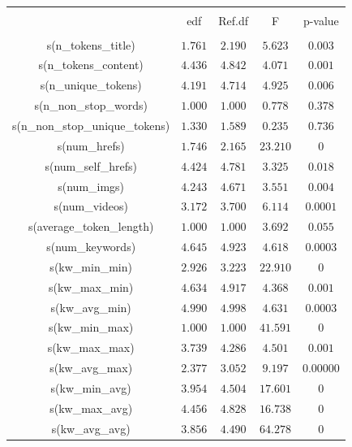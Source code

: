 
\begin{table}[h] \centering 
  \caption{} 
  \label{} 
\begin{tabular}{@{\extracolsep{5pt}} ccccc} 
\\[-1.8ex]\hline 
\hline \\[-1.8ex] 
 & edf & Ref.df & F & p-value \\ 
\hline \\[-1.8ex] 
s(n\_tokens\_title) & $1.761$ & $2.190$ & $5.623$ & $0.003$ \\ 
s(n\_tokens\_content) & $4.436$ & $4.842$ & $4.071$ & $0.001$ \\ 
s(n\_unique\_tokens) & $4.191$ & $4.714$ & $4.925$ & $0.006$ \\ 
s(n\_non\_stop\_words) & $1.000$ & $1.000$ & $0.778$ & $0.378$ \\ 
s(n\_non\_stop\_unique\_tokens) & $1.330$ & $1.589$ & $0.235$ & $0.736$ \\ 
s(num\_hrefs) & $1.746$ & $2.165$ & $23.210$ & $0$ \\ 
s(num\_self\_hrefs) & $4.424$ & $4.781$ & $3.325$ & $0.018$ \\ 
s(num\_imgs) & $4.243$ & $4.671$ & $3.551$ & $0.004$ \\ 
s(num\_videos) & $3.172$ & $3.700$ & $6.114$ & $0.0001$ \\ 
s(average\_token\_length) & $1.000$ & $1.000$ & $3.692$ & $0.055$ \\ 
s(num\_keywords) & $4.645$ & $4.923$ & $4.618$ & $0.0003$ \\ 
s(kw\_min\_min) & $2.926$ & $3.223$ & $22.910$ & $0$ \\ 
s(kw\_max\_min) & $4.634$ & $4.917$ & $4.368$ & $0.001$ \\ 
s(kw\_avg\_min) & $4.990$ & $4.998$ & $4.631$ & $0.0003$ \\ 
s(kw\_min\_max) & $1.000$ & $1.000$ & $41.591$ & $0$ \\ 
s(kw\_max\_max) & $3.739$ & $4.286$ & $4.501$ & $0.001$ \\ 
s(kw\_avg\_max) & $2.377$ & $3.052$ & $9.197$ & $0.00000$ \\ 
s(kw\_min\_avg) & $3.954$ & $4.504$ & $17.601$ & $0$ \\ 
s(kw\_max\_avg) & $4.456$ & $4.828$ & $16.738$ & $0$ \\ 
s(kw\_avg\_avg) & $3.856$ & $4.490$ & $64.278$ & $0$ \\ 

\end{tabular}
\end{table}
